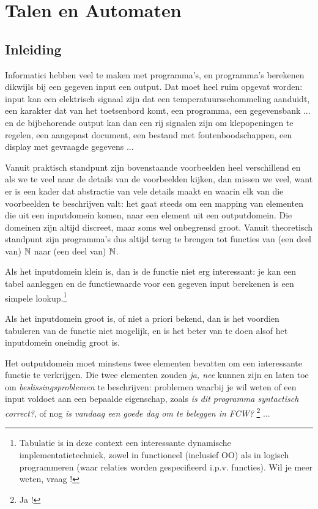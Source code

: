 \chapter{Talen en Automaten}\label{chap:talenautomaten}

\section{Inleiding}


Informatici hebben veel te maken met programma's, en programma's
berekenen dikwijls bij een gegeven input een output. Dat moet heel
ruim opgevat worden: input kan een elektrisch signaal zijn dat een
temperatuursschommeling aanduidt, een karakter dat van het toetsenbord
komt, een programma, een gegevensbank ... en de bijbehorende output
kan dan een rij signalen zijn om klepopeningen te regelen, een
aangepast document, een bestand met foutenboodschappen, een display
met gevraagde gegevens ...


Vanuit praktisch standpunt zijn bovenstaande voorbeelden heel
verschillend en als we te veel naar de details van de voorbeelden
kijken, dan missen we veel, want er is een kader dat abstractie van
vele details maakt en waarin elk van die voorbeelden te beschrijven
valt: het gaat steeds om een mapping van elementen die uit een
inputdomein komen, naar een element uit een outputdomein. Die domeinen
zijn altijd discreet, maar soms wel onbegrensd groot.  Vanuit
theoretisch standpunt zijn programma's dus altijd terug te brengen tot
functies van (een deel van) $\mathbb{N}$ naar (een deel van) $\mathbb{N}$.  


Als het inputdomein klein is, dan is de functie niet erg interessant:
je kan een tabel aanleggen en de functiewaarde voor een gegeven input
berekenen is een simpele lookup.\footnote{Tabulatie is in deze context
een interessante dynamische implementatietechniek, zowel in
functioneel (inclusief OO) als in logisch programmeren (waar relaties
worden gespecifieerd i.p.v. functies). Wil je meer weten, vraag !}


Als het inputdomein groot is, of niet a priori bekend, dan is het
voordien tabuleren van de functie niet mogelijk, en is het beter van
te doen alsof het inputdomein oneindig groot is.  

Het outputdomein moet minstens twee elementen bevatten om een
interessante functie te verkrijgen. Die twee elementen zouden {\em ja,
nee} kunnen zijn en laten toe om {\em beslissingsproblemen} te
beschrijven: problemen waarbij je wil weten of een input voldoet aan
een bepaalde eigenschap, zoals {\em is dit programma syntactisch
correct?}, of nog {\em is vandaag een goede dag om te beleggen in
FCW?} \footnote{Ja !}  ...  

